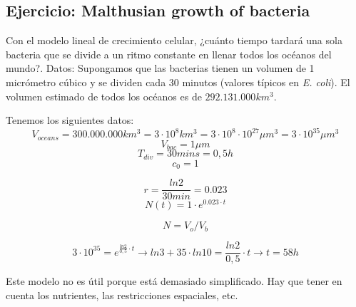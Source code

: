 \subsection{Ejercicio: Malthusian growth of bacteria}
Con el modelo lineal de crecimiento celular, ¿cuánto tiempo tardará una sola bacteria que se divide a un ritmo constante en llenar todos los océanos del mundo?. Datos: Supongamos que las bacterias tienen un volumen de 1 micrómetro cúbico y se dividen cada 30 minutos (valores típicos en \textit{E. coli}). El volumen estimado de todos los océanos es de $292.131.000 km^3$.

Tenemos los siguientes datos:
$$V_{oceans} = 300.000.000 km^3 = 3 \cdot 10^8 km^3 = 3 \cdot 10^8 \cdot 10^{27} \mu m^3 = 3 \cdot 10^{35} \mu m^3$$
$$V_{bac} = 1 \mu m$$
$$T_{div} = 30 mins = 0,5 h$$
$$c_0 = 1$$

$$r = \frac{ln 2}{30 min} = 0.023$$
$$N(t) = 1 \cdot e^{0.023 \cdot t}$$

$$N = V_o / V_b$$

$$3 \cdot 10^{35} = e^{\frac{ln 2}{0,5} \cdot t} \rightarrow ln 3 + 35 \cdot ln 10 = \frac{ln 2}{0,5} \cdot t \rightarrow t = 58 h$$

Este modelo no es útil porque está demasiado simplificado. Hay que tener en cuenta los nutrientes, las restricciones espaciales, etc. 
